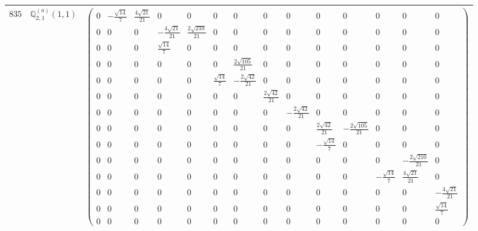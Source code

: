 \documentclass[fleqn,8pt,landscape]{jsarticle}
\begin{document}
\begin{center}
\begin{longtable}{ccc}
$ 835 $ & $ \mathbb{Q}_{2,1}^{(a)}(1,1) $ & $ \begin{pmatrix} 0 & - \frac{\sqrt{14}}{7} & \frac{4 \sqrt{21}}{21} & 0 & 0 & 0 & 0 & 0 & 0 & 0 & 0 & 0 & 0 & 0 \\ 0 & 0 & 0 & - \frac{4 \sqrt{21}}{21} & \frac{2 \sqrt{210}}{21} & 0 & 0 & 0 & 0 & 0 & 0 & 0 & 0 & 0 \\ 0 & 0 & 0 & \frac{\sqrt{14}}{7} & 0 & 0 & 0 & 0 & 0 & 0 & 0 & 0 & 0 & 0 \\ 0 & 0 & 0 & 0 & 0 & 0 & \frac{2 \sqrt{105}}{21} & 0 & 0 & 0 & 0 & 0 & 0 & 0 \\ 0 & 0 & 0 & 0 & 0 & \frac{\sqrt{14}}{7} & - \frac{2 \sqrt{42}}{21} & 0 & 0 & 0 & 0 & 0 & 0 & 0 \\ 0 & 0 & 0 & 0 & 0 & 0 & 0 & \frac{2 \sqrt{42}}{21} & 0 & 0 & 0 & 0 & 0 & 0 \\ 0 & 0 & 0 & 0 & 0 & 0 & 0 & 0 & - \frac{2 \sqrt{42}}{21} & 0 & 0 & 0 & 0 & 0 \\ 0 & 0 & 0 & 0 & 0 & 0 & 0 & 0 & 0 & \frac{2 \sqrt{42}}{21} & - \frac{2 \sqrt{105}}{21} & 0 & 0 & 0 \\ 0 & 0 & 0 & 0 & 0 & 0 & 0 & 0 & 0 & - \frac{\sqrt{14}}{7} & 0 & 0 & 0 & 0 \\ 0 & 0 & 0 & 0 & 0 & 0 & 0 & 0 & 0 & 0 & 0 & 0 & - \frac{2 \sqrt{210}}{21} & 0 \\ 0 & 0 & 0 & 0 & 0 & 0 & 0 & 0 & 0 & 0 & 0 & - \frac{\sqrt{14}}{7} & \frac{4 \sqrt{21}}{21} & 0 \\ 0 & 0 & 0 & 0 & 0 & 0 & 0 & 0 & 0 & 0 & 0 & 0 & 0 & - \frac{4 \sqrt{21}}{21} \\ 0 & 0 & 0 & 0 & 0 & 0 & 0 & 0 & 0 & 0 & 0 & 0 & 0 & \frac{\sqrt{14}}{7} \\ 0 & 0 & 0 & 0 & 0 & 0 & 0 & 0 & 0 & 0 & 0 & 0 & 0 & 0 \end{pmatrix} $ \\ \hline

\end{longtable}
\end{center}
\end{document}

